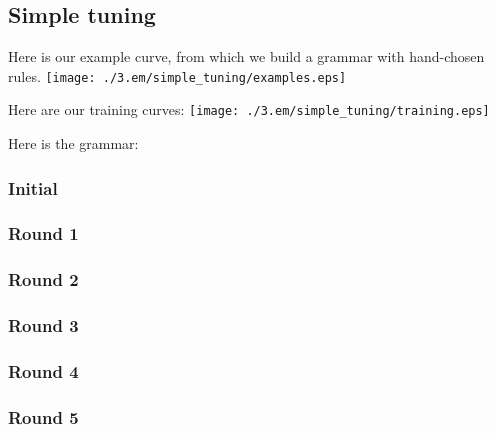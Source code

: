 
\subsection{Simple tuning}

Here is our example curve, from which we build a grammar with hand-chosen rules.
\texttt{[image: ./3.em/simple\_tuning/examples.eps]}

Here are our training curves:
\texttt{[image: ./3.em/simple\_tuning/training.eps]}

Here is the grammar:

\subsubsection{Initial}


\subsubsection{Round 1}

\subsubsection{Round 2}

\subsubsection{Round 3}

\subsubsection{Round 4}

\subsubsection{Round 5}


